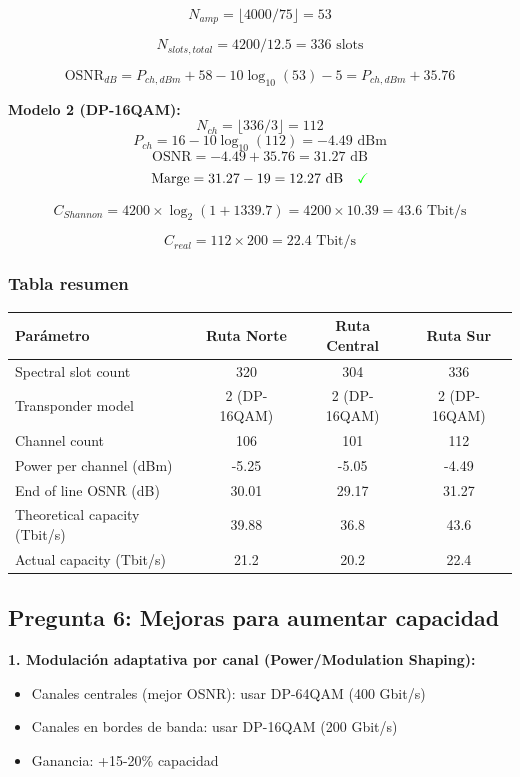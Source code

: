\documentclass[12pt,a4paper]{extarticle}
\begin{document}
$$N_{amp} = \lfloor 4000/75 \rfloor = 53$$

$$N_{slots,total} = 4200/12.5 = 336 \text{ slots}$$

$$\text{OSNR}_{dB} = P_{ch,dBm} + 58 - 10\log_{10}(53) - 5 = P_{ch,dBm} + 35.76$$

\textbf{Modelo 2 (DP-16QAM):}
$$N_{ch} = \lfloor 336/3 \rfloor = 112$$
$$P_{ch} = 16 - 10\log_{10}(112) = -4.49 \text{ dBm}$$
$$\text{OSNR} = -4.49 + 35.76 = 31.27 \text{ dB}$$
$$\text{Marge} = 31.27 - 19 = 12.27 \text{ dB} \quad \textcolor{green}{\checkmark}$$

$$C_{Shannon} = 4200 \times \log_2(1 + 1339.7) = 4200 \times 10.39 = 43.6 \text{ Tbit/s}$$

$$C_{real} = 112 \times 200 = 22.4 \text{ Tbit/s}$$

\subsubsection*{Tabla resumen}

\begin{center}
\begin{tabular}{|l|c|c|c|}
\hline
\textbf{Parámetro} & \textbf{Ruta Norte} & \textbf{Ruta Central} & \textbf{Ruta Sur} \\
\hline
Spectral slot count & 320 & 304 & 336 \\
\hline
Transponder model & 2 (DP-16QAM) & 2 (DP-16QAM) & 2 (DP-16QAM) \\
\hline
Channel count & 106 & 101 & 112 \\
\hline
Power per channel (dBm) & -5.25 & -5.05 & -4.49 \\
\hline
End of line OSNR (dB) & 30.01 & 29.17 & 31.27 \\
\hline
Theoretical capacity (Tbit/s) & 39.88 & 36.8 & 43.6 \\
\hline
Actual capacity (Tbit/s) & 21.2 & 20.2 & 22.4 \\
\hline
\end{tabular}
\end{center}

\subsection*{Pregunta 6: Mejoras para aumentar capacidad}

\textbf{1. Modulación adaptativa por canal (Power/Modulation Shaping):}
\begin{itemize}
    \item Canales centrales (mejor OSNR): usar DP-64QAM (400 Gbit/s)
    \item Canales en bordes de banda: usar DP-16QAM (200 Gbit/s)
    \item Ganancia: +15-20\% capacidad
\end{itemize}
\end{document}
